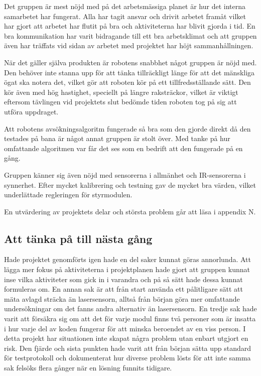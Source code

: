 \documentclass[11pt]{article}
\begin{document}
\begin{flushleft}
Det gruppen är mest nöjd med på det arbetsmässiga planet är hur det interna samarbetet har fungerat. Alla har tagit ansvar och drivit arbetet framåt vilket har gjort att arbetet har flutit på bra och aktiviteterna har blivit gjorda i tid. En bra kommunikation har varit bidragande till ett bra arbetsklimat och att gruppen även har träffats vid sidan av arbetet med projektet har höjt sammanhållningen.

När det gäller själva produkten är robotens snabbhet något gruppen är nöjd med. Den behöver inte stanna upp för att tänka tillräckligt länge för att det mänskliga ögat ska notera det, vilket gör att roboten kör på ett tillfredsställande sätt. Den kör även med hög hastighet, speciellt på längre raksträckor, vilket är viktigt eftersom tävlingen vid projektets slut bedömde tiden roboten tog på sig att utföra uppdraget. 

Att robotens avsökningsalgoritm fungerade så bra som den gjorde direkt då den testades på bana är något annat gruppen är stolt över. Med tanke på hur omfattande algoritmen var får det ses som en bedrift att den fungerade på en gång. 

Gruppen känner sig även nöjd med sensorerna i allmänhet och IR-sensorerna i synnerhet. Efter mycket kalibrering och testning gav de mycket bra värden, vilket underlättade regleringen för styrmodulen.

En utvärdering av projektets delar och största problem går att läsa i appendix N.

\subsection{Att tänka på till nästa gång}
Hade projektet genomförts igen hade en del saker kunnat göras annorlunda. Att lägga mer fokus på aktiviteterna i projektplanen hade gjort att gruppen kunnat inse vilka aktiviteter som gick in i varandra och på så sätt hade dessa kunnat formuleras om. En annan sak är att från start använda ett pålitligare sätt att mäta avlagd sträcka än lasersensorn, alltså från början göra mer omfattande undersökningar om det fanns andra alternativ än lasersensorn. En tredje sak hade varit att försäkra sig om att det för varje modul finns två personer som är insatta i hur varje del av koden fungerar för att minska beroendet av en viss person. I detta projekt har situationen inte skapat några problem utan enbart utgjort en risk. Den fjärde och sista punkten hade varit att från början sätta upp standard för testprotokoll och dokumenterat hur diverse problem lösts för att inte samma sak felsöks flera gånger när en lösning funnits tidigare. 


\end{flushleft}
\end{document}
